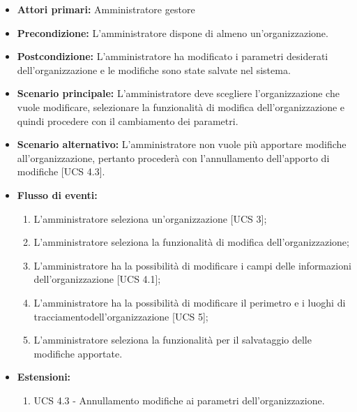 \begin{itemize}
    \item \textbf{Attori primari:} Amministratore gestore
    \item \textbf{Precondizione:} L'amministratore dispone di almeno un'organizzazione.
    \item \textbf{Postcondizione:} L'amministratore ha modificato i parametri desiderati dell'organizzazione e le modifiche sono state salvate nel sistema.
    \item \textbf{Scenario principale:} L'amministratore deve scegliere l'organizzazione che vuole modificare, selezionare la funzionalità di modifica dell'organizzazione e quindi procedere con il cambiamento dei parametri.
    \item \textbf{Scenario alternativo:} L'amministratore non vuole più apportare modifiche all'organizzazione, pertanto procederà con l'annullamento dell'apporto di modifiche [UCS 4.3].
    \item \textbf{Flusso di eventi:}
    \begin{enumerate}
        \item L'amministratore seleziona un'organizzazione [UCS 3];
        \item L'amministratore seleziona la funzionalità di modifica dell'organizzazione;
        \item L'amministratore ha la possibilità di modificare i campi delle informazioni dell'organizzazione [UCS 4.1];
        \item L'amministratore ha la possibilità di modificare il perimetro e i luoghi di tracciamentodell'organizzazione [UCS 5];
        \item L'amministratore seleziona la funzionalità per il salvataggio delle modifiche apportate.
    \end{enumerate}
    \item \textbf{Estensioni:}
    \begin{enumerate}
        \item UCS 4.3 - Annullamento modifiche ai parametri dell'organizzazione.
    \end{enumerate}
\end{itemize}
\newpage
